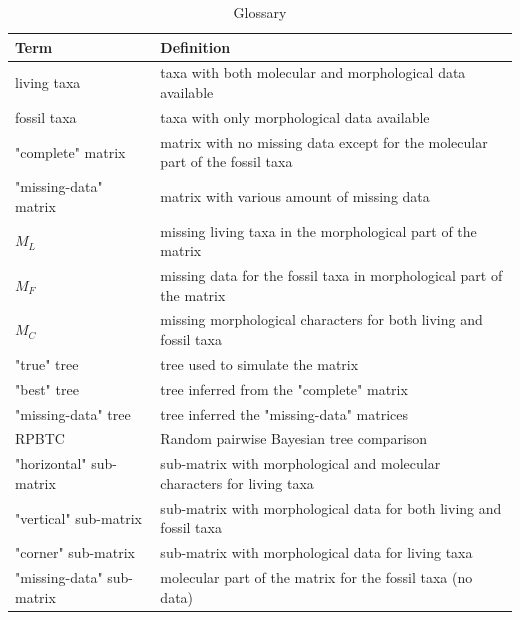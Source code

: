 \documentclass[12pt,letterpaper]{article}
\begin{document}
\begin{table}[ht]
\caption{Glossary}
\centering
\begin{tabular}{p{5cm} p{9cm}}
\hline
\hfill Term & Definition \\[0.5ex]
\hline
\hfill living taxa & taxa with both molecular and morphological data available \\[1.5ex]
\hfill fossil taxa & taxa with only morphological data available \\[1.5ex]
\hfill "complete" matrix & matrix with no missing data except for the molecular part of the fossil taxa \\[1.5ex]
\hfill "missing-data" matrix & matrix with various amount of missing data \\[1.5ex]
\hfill $M_{L}$ & missing living taxa in the morphological part of the matrix \\[1.5ex]
\hfill $M_{F}$ & missing data for the fossil taxa in morphological part of the matrix \\[1.5ex]
\hfill $M_{C}$ & missing morphological characters for both living and fossil taxa \\[1.5ex]
\hfill "true" tree & tree used to simulate the matrix \\[1.5ex]
\hfill "best" tree & tree inferred from the "complete" matrix \\[1.5ex]
\hfill "missing-data" tree & tree inferred the "missing-data" matrices \\[1.5ex]
\hfill RPBTC & Random pairwise Bayesian tree comparison \\[1.5ex]
\hfill "horizontal" sub-matrix & sub-matrix with morphological and molecular characters for living taxa \\[1.5ex]
\hfill "vertical" sub-matrix & sub-matrix with morphological data for both living and fossil taxa \\[1.5ex]
\hfill "corner" sub-matrix & sub-matrix with morphological data for living taxa \\[1.5ex]
\hfill "missing-data" sub-matrix & molecular part of the matrix for the fossil taxa (no data) \\
\end{tabular}
\label{Tab_glossary}
\end{table}

\end{document}
